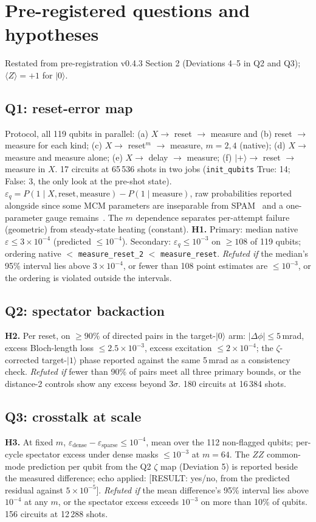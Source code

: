 \documentclass[aps,pra,reprint,superscriptaddress,nofootinbib,longbibliography,amsmath,amssymb]{revtex4-2}
\newcommand{\placeholder}[1]{\textcolor{red!70!black}{[RESULT: #1]}}
\newcommand{\eps}{\varepsilon}
\begin{document}
\section{Pre-registered questions and hypotheses}\label{sec:prereg}
Restated from pre-registration v0.4.3 Section 2 (Deviations 4--5 in Q2 and Q3); $\langle Z\rangle = +1$ for $|0\rangle$.

\subsection{Q1: reset-error map}
Protocol, all 119 qubits in parallel: (a) $X \to$ reset $\to$ measure and (b) reset $\to$ measure for each kind; (c) $X \to$ reset$^m$ $\to$ measure, $m = 2, 4$ (native); (d) $X \to$ measure and measure alone; (e) $X \to$ delay $\to$ measure; (f) $|+\rangle \to$ reset $\to$ measure in $X$. 17 circuits at 65\,536 shots in two jobs (\texttt{init\_qubits} True: 14; False: 3, the only look at the pre-shot state). $\eps_q = P(1\mid X,\text{reset},\text{measure}) - P(1\mid\text{measure})$, raw probabilities reported alongside since some MCM parameters are inseparable from SPAM~\cite{Zhang2025} and a one-parameter gauge remains~\cite{Chu2026}. The $m$ dependence separates per-attempt failure (geometric) from steady-state heating (constant). \textbf{H1.} Primary: median native $\eps \leq 3\times10^{-4}$ (predicted $\leq 10^{-4}$). Secondary: $\eps_q \leq 10^{-3}$ on $\geq 108$ of 119 qubits; ordering native $<$ \texttt{measure\_reset\_2} $<$ \texttt{measure\_reset}. \emph{Refuted if} the median's 95\% interval lies above $3\times10^{-4}$, or fewer than 108 point estimates are $\leq 10^{-3}$, or the ordering is violated outside the intervals.

\subsection{Q2: spectator backaction}
\textbf{H2.} Per reset, on $\geq 90\%$ of directed pairs in the target-$|0\rangle$ arm: $|\Delta\phi| \leq 5$\,mrad, excess Bloch-length loss $\leq 2.5\times10^{-3}$, excess excitation $\leq 2\times10^{-4}$; the $\zeta$-corrected target-$|1\rangle$ phase reported against the same 5\,mrad as a consistency check. \emph{Refuted if} fewer than 90\% of pairs meet all three primary bounds, or the distance-2 controls show any excess beyond $3\sigma$. 180 circuits at 16\,384 shots.

\subsection{Q3: crosstalk at scale}
\textbf{H3.} At fixed $m$, $\eps_{\mathrm{dense}} - \eps_{\mathrm{sparse}} \leq 10^{-4}$, mean over the 112 non-flagged qubits; per-cycle spectator excess under dense masks $\leq 10^{-3}$ at $m = 64$. The $ZZ$ common-mode prediction per qubit from the Q2 $\zeta$ map (Deviation 5) is reported beside the measured difference; echo applied: \placeholder{yes/no, from the predicted residual against $5\times10^{-5}$}. \emph{Refuted if} the mean difference's 95\% interval lies above $10^{-4}$ at any $m$, or the spectator excess exceeds $10^{-3}$ on more than 10\% of qubits. 156 circuits at 12\,288 shots.
\end{document}
